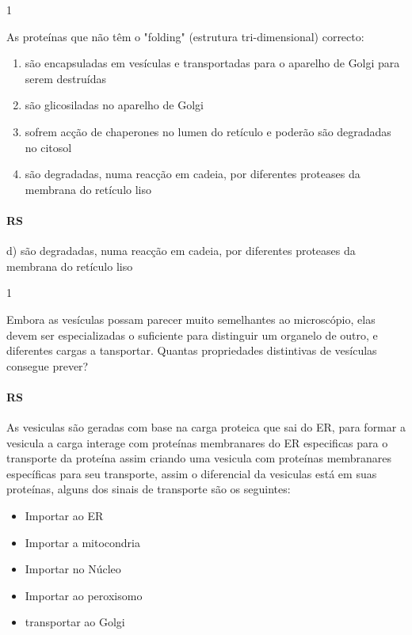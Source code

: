 \documentclass[\mainfilename]{subfiles}
\begin{document}
\begin{questionBox}1{}
    
    As proteínas que não têm o "folding" (estrutura tri-dimensional) correcto:
    \begin{enumerate}[label=\alph{enumi})]
        \item são encapsuladas em vesículas e transportadas para o aparelho de Golgi para serem destruídas
        \item são glicosiladas no aparelho de Golgi
        \item sofrem acção de chaperones no lumen do retículo e poderão são degradadas no citosol
        \item são degradadas, numa reacção em cadeia, por diferentes proteases da membrana do retículo liso
    \end{enumerate}

    \paragraph*{RS} d) são degradadas, numa reacção em cadeia, por diferentes proteases da membrana do retículo liso
    
\end{questionBox}

\begin{questionBox}1{}
    
    Embora as vesículas possam parecer muito semelhantes ao microscópio, elas devem ser especializadas o suficiente para distinguir um organelo de outro, e diferentes cargas a tansportar. Quantas propriedades distintivas de vesículas consegue prever?

    \paragraph*{RS}
    As vesiculas são geradas com base na carga proteica que sai do ER, para formar a vesicula a carga interage com proteínas membranares do ER especificas para o transporte da proteína assim criando uma vesicula com proteínas membranares específicas para seu transporte, assim o diferencial da vesiculas está em suas proteínas, alguns dos sinais de transporte são os seguintes:
    \begin{itemize}
        \item Importar ao ER
        \item Importar a mitocondria
        \item Importar no Núcleo
        \item Importar ao peroxisomo
        \item transportar ao Golgi
    \end{itemize}
    
\end{questionBox}
\end{document}
